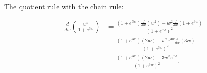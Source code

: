 \documentclass{ximera}
\begin{document}
\begin{example} \label{E8787dfg4t4tre}
The quotient rule with the chain rule:

\begin{align*}
\frac{d}{dw}\left( \frac{w^2}{1+ e^{3w}} \right) &= \frac{(1+e^{3w})\frac{d}{dw}(w^2) - w^2\frac{d}{dw}(1+e^{3w})}{(1+e^{3w})^2}  \\
                 &= \frac{(1+e^{3w})(2w) - w^2 e^{3w}\frac{d}{dw}(3w)}{(1+e^{3w})^2}  \\
                 &= \frac{(1+e^{3w})(2w) - 3w^2 e^{3w}}{(1+e^{3w})^2} .
\end{align*}
\end{example}
\end{document}
